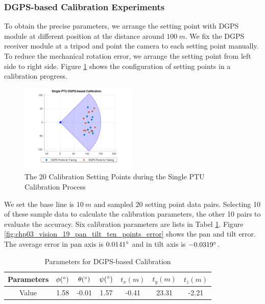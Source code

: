 \documentclass[journal,article,submit,moreauthors,pdftex,10pt,a4paper]{mdpi}
\begin{document}
\subsubsection{DGPS-based Calibration Experiments}
To obtain the precise parameters, we arrange the setting point with DGPS module at different position at the distance around $100\ m$. We fix the DGPS receiver module at a tripod and point the camera to each setting point manually. To reduce the mechanical rotation error, we arrange the setting point from left side to right side. Figure \ref{fig:chp03_vision_18_dgps_calibration_diagram} shows the configuration of setting points in a calibration progress.

\begin{figure}[!ht]
	\centering
	\includegraphics[width=0.5\textwidth]{Figs/chp03_vision_18_dgps_calibration_diagram.pdf}	
	\caption{The 20 Calibration Setting Points during the Single PTU Calibration Process}
	\label{fig:chp03_vision_18_dgps_calibration_diagram}
\end{figure}

We set the base line is $10\ m$ and sampled 20 setting point data pairs. Selecting 10 of these sample data to calculate the calibration parameters, the other 10 pairs to evaluate the accuracy. Six calibration parameters are lists in Tabel \ref{label:dgps_calibration}. Figure \ref{fig:chp03_vision_19_pan_tilt_ten_points_error} shows the pan and tilt error. The average error in pan axis is $0.0141 \degree$ and in tilt axis is $-0.0319\degree$.

\begin{table}[htb]
	\centering
	\caption{Parameters for DGPS-based Calibration}
	\label{label:dgps_calibration}
	\begin{tabular}{ccccccc}
		\hline
		Parameters & $\phi (\degree)$ & $\theta (\degree)$ & $\psi (\degree)$ & $t_x (m)$ & $t_y(m)$ & $t_z(m)$ \\ \hline
		Value & 1.58             & -0.01              & 1.57             & -0.41     & 23.31   & -2.21    \\ \hline
	\end{tabular}
\end{table}
\end{document}
